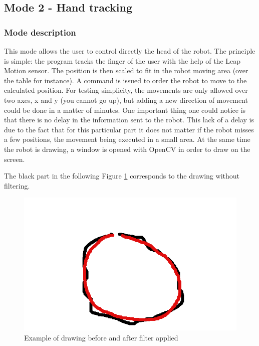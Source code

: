 \subsection{Mode 2 - Hand tracking}

\subsubsection{Mode description}

This mode allows the user to control directly the head of the robot. The principle is simple: the program tracks the finger of the user with the help of the Leap Motion sensor. The position is then scaled to fit in the robot moving area (over the table for instance). A command is issued to order the robot to move to the calculated position. For testing simplicity, the movements are only allowed over two axes, x and y (you cannot go up), but adding a new direction of movement could be done in a matter of minutes.
One important thing one could notice is that there is no delay in the information sent to the robot. This lack of a delay is due to the fact that for this particular part it does not matter if the robot misses a few positions, the movement being executed in a small area.
At the same time the robot is drawing, a window is opened with OpenCV in order to draw on the screen.

The black part in the following Figure \ref{fig:cloudNotCloud} corresponds to the drawing without filtering.

\begin{figure}[H]
	\includegraphics[scale = 0.5]{cloudNotCloud}
	\centering
	\caption{Example of drawing before and after filter applied}
	\label{fig:cloudNotCloud}
\end{figure}

